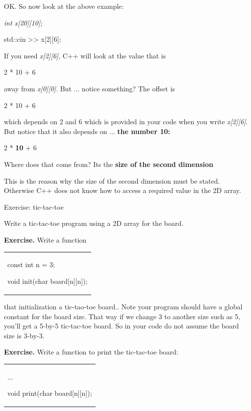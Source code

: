 OK. So now look at the above example:

\emph{int x{[}20{]}{[}10{]};}

std::cin \textgreater\textgreater{} x{[}2{]}{[}6{]};

If you need \emph{x{[}2{]}{[}6{]}}, C++ will look at the value that is

2 * 10 + 6

away from \emph{x{[}0{]}{[}0{]}}. But ... notice something? The offset
is

2 * 10 + 6

which depends on 2 and 6 which is provided in your code when you write
\emph{x{[}2{]}{[}6{]}}. But notice that it also depends on ...
\textbf{the number 10:}

2 * \textbf{10} + 6

Where does that come from? It\textquotesingle s the \textbf{size of the
second dimension}

This is the reason why the size of the second dimension must be stated.
Otherwise C++ does not know how to access a required value in the 2D
array.

Exercise: tic-tac-toe

Write a tic-tac-toe program using a 2D array for the board.

\textbf{Exercise.} Write a function

\begin{longtable}[]{@{}
  >{\raggedright\arraybackslash}p{}@{}}
\toprule\noalign{}
 \\
\midrule\noalign{}
\endhead
\bottomrule\noalign{}
\endlastfoot
const int n = 3;

void init(char board{[}n{]}{[}n{]}); \\
\end{longtable}

that initialization a tic-tao-toe board.. Note your program should have
a global constant for the board size. That way if we change 3 to another
size such as 5, you'll get a 5-by-5 tic-tac-toe board. So in your code
do not assume the board size is 3-by-3.

\textbf{Exercise.} Write a function to print the tic-tac-toe board:

\begin{longtable}[]{@{}
  >{\raggedright\arraybackslash}p{}@{}}
\toprule\noalign{}
 \\
\midrule\noalign{}
\endhead
\bottomrule\noalign{}
\endlastfoot
...

void print(char board{[}n{]}{[}n{]}); \\
\end{longtable}


